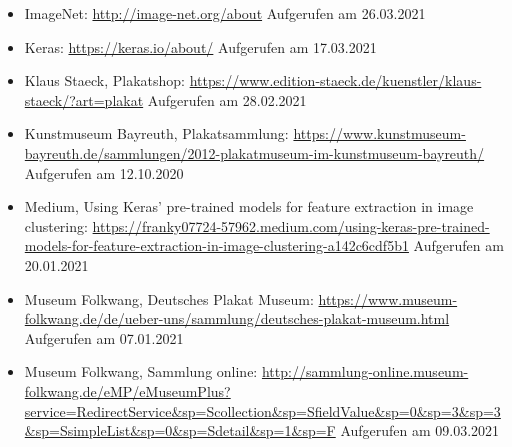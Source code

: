 \documentclass[a4paper,12pt,ngerman]{article}
\begin{document}
\begin{itemize}
\item ImageNet: \newline \href{http://image-net.org/about}{http://image-net.org/about} \newline Aufgerufen am 26.03.2021
\item Keras: \newline \href{https://keras.io/about/}{https://keras.io/about/} \newline Aufgerufen am 17.03.2021
\item Klaus Staeck, Plakatshop: \newline \href{https://www.edition-staeck.de/kuenstler/klaus-staeck/?art=plakat}{https://www.edition-staeck.de/kuenstler/klaus-staeck/?art=plakat} \newline Aufgerufen am 28.02.2021
\item Kunstmuseum Bayreuth, Plakatsammlung: \newline \href{https://www.kunstmuseum-bayreuth.de/sammlungen/2012-plakatmuseum-im-kunstmuseum-bayreuth/}{https://www.kunstmuseum-bayreuth.de/sammlungen/2012-plakatmuseum-im-kunstmuseum-bayreuth/} \newline Aufgerufen am 12.10.2020
\item Medium, Using Keras' pre-trained models for feature extraction in image clustering: \newline \href{https://franky07724-57962.medium.com/using-keras-pre-trained-models-for-feature-extraction-in-image-clustering-a142c6cdf5b1}{https://franky07724-57962.medium.com/using-keras-pre-trained-models-for-feature-extraction-in-image-clustering-a142c6cdf5b1} \newline Aufgerufen am 20.01.2021
\item Museum Folkwang, Deutsches Plakat Museum: \newline \href{https://www.museum-folkwang.de/de/ueber-uns/sammlung/deutsches-plakat-museum.html}{https://www.museum-folkwang.de/de/ueber-uns/sammlung/deutsches-plakat-museum.html} \newline Aufgerufen am 07.01.2021
\item Museum Folkwang, Sammlung online: \newline \href{http://sammlung-online.museum-folkwang.de/eMP/eMuseumPlus?service=RedirectService\&sp=Scollection\&sp=SfieldValue\&sp=0\&sp=3\&sp=3\&sp=SsimpleList\&sp=0\&sp=Sdetail\&sp=1\&sp=F}{http://sammlung-online.museum-folkwang.de/eMP/eMuseumPlus?service=\newline RedirectService\&sp=Scollection\&sp=SfieldValue\&sp=0\&sp=3\&sp=3\&sp=\newline SsimpleList\&sp=0\&sp=Sdetail\&sp=1\&sp=F} \newline Aufgerufen am 09.03.2021

\end{itemize}
\end{document}
